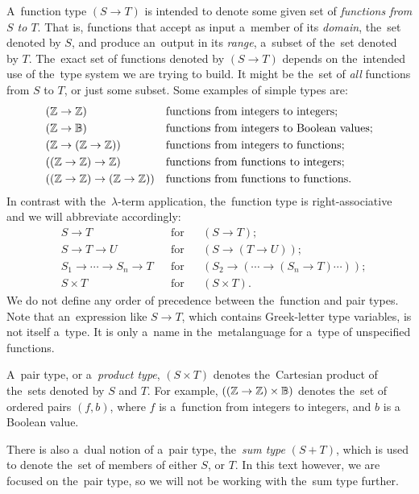 A~function type $(S \to T)$ is intended to denote some given set of
\emph{functions from $S$ to $T$}. That is, functions that accept as input
a~member of its \emph{domain}, the~set denoted by $S$, and produce an~output in
its \emph{range}, a~subset of the~set denoted by $T$. The~exact set of functions
denoted by $(S \to T)$ depends on the~intended use of the~type system we are
trying to build. It might be the~set of \emph{all} functions from $S$ to $T$, or
just some subset. Some examples of simple types are:
\begin{align*}
  &(\mathbb{Z} \to \mathbb{Z}) && \text{functions from integers to integers;} \\
  &(\mathbb{Z} \to \mathbb{B}) && \text{functions from integers to Boolean values;} \\
  &(\mathbb{Z} \to (\mathbb{Z} \to \mathbb{Z})) && \text{functions from integers to functions;} \\
  &((\mathbb{Z} \to \mathbb{Z}) \to \mathbb{Z}) && \text{functions from functions to integers;} \\
  &((\mathbb{Z} \to \mathbb{Z}) \to (\mathbb{Z} \to \mathbb{Z})) && \text{functions from functions to
    functions.}
\end{align*}
In contrast with the~$\lambda$-term application, the~function type is
right-associative and we will abbreviate accordingly:
\begin{align*}
  &S \to T  &  &\text{for} &  &(S \to T); \\
  &S \to T \to U  &  &\text{for} &  &(S \to (T \to U)); \\
  &S_1 \to \dotsb \to S_n \to T  &  &\text{for} &
    &(S_2 \to ( \dotsb \to (S_n \to T) \dotsb )); \\
  &S \times T  &  &\text{for} &  &(S \times T).
\end{align*}
We do not define any order of precedence between the~function and pair types.
Note that an~expression like $S \to T$, which contains Greek-letter type
variables, is not itself a~type. It is only a~name in the~metalanguage for
a~type of unspecified functions.

A~pair type, or a~\emph{product type}, $(S \times T)$ denotes the~Cartesian
product of the~sets denoted by $S$ and $T$. For example, $((\mathbb{Z} \to \mathbb{Z})
\times \mathbb{B})$ denotes the~set of ordered pairs $(f, b)$, where $f$ is
a~function from integers to integers, and $b$ is a Boolean value.

There is also a~dual notion of a~pair type, the~\emph{sum type} $(S + T)$, which
is used to denote the~set of members of either $S$, or $T$. In this text
however, we are focused on the~pair type, so we will not be working with the~sum
type further.

